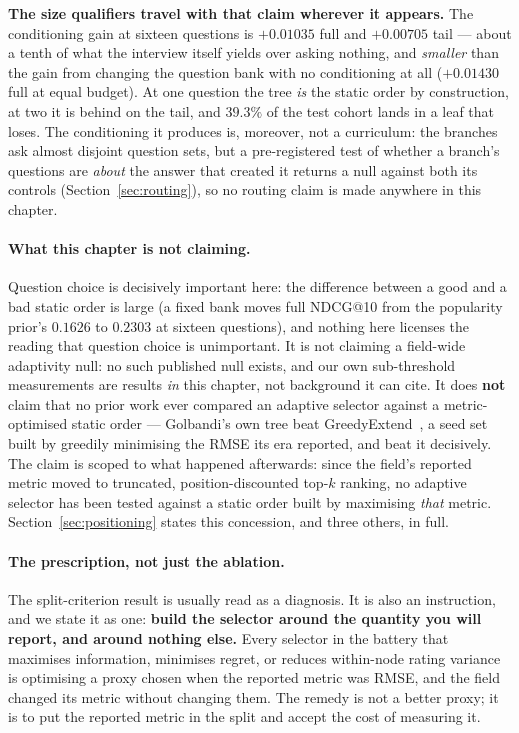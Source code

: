 \documentclass[11pt]{article}
\begin{document}
\textbf{The size qualifiers travel with that claim wherever it appears.} The conditioning gain at
sixteen questions is $+0.01035$ full and $+0.00705$ tail --- about a tenth of what the interview
itself yields over asking nothing, and \emph{smaller} than the gain from changing the question bank
with no conditioning at all ($+0.01430$ full at equal budget). At one question the tree \emph{is} the
static order by construction, at two it is behind on the tail, and $39.3\%$ of the test cohort lands
in a leaf that loses. The conditioning it produces is, moreover, not a
curriculum: the branches ask almost disjoint question sets, but a pre-registered test of whether a
branch's questions are \emph{about} the answer that created it returns a null against both its
controls (Section~\ref{sec:routing}), so no routing claim is made anywhere in this chapter.

\paragraph{What this chapter is not claiming.} Question choice is decisively important here:
the difference between a good and a bad static order is large (a fixed bank moves full NDCG@10 from
the popularity prior's $0.1626$ to $0.2303$ at sixteen questions), and nothing here licenses the
reading that question choice is unimportant. It is not claiming a field-wide adaptivity null: no
such published null exists, and our own sub-threshold measurements are results \emph{in} this
chapter, not background it can cite. It does \textbf{not} claim that no prior work ever
compared an adaptive selector against a metric-optimised static order --- Golbandi's own tree beat
GreedyExtend~\cite{golbandi2010bootstrapping}, a seed set built by greedily minimising the RMSE its
era reported, and beat it decisively. The claim is scoped to what happened afterwards: since the
field's reported metric moved to truncated, position-discounted top-$k$ ranking, no adaptive
selector has been tested against a static order built by maximising \emph{that} metric.
Section~\ref{sec:positioning} states this concession, and three others, in full.

\paragraph{The prescription, not just the ablation.} The split-criterion result is usually read as a
diagnosis. It is also an instruction, and we state it as one: \textbf{build the selector around the
quantity you will report, and around nothing else.} Every selector in the battery that maximises
information, minimises regret, or reduces within-node rating variance is optimising a proxy chosen
when the reported metric was RMSE, and the field changed its metric without changing them. The
remedy is not a better proxy; it is to put the reported metric in the split and accept the cost of
measuring it.
\end{document}
